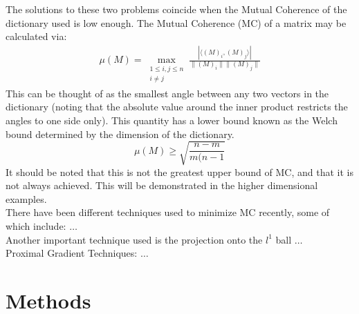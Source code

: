 \documentclass[journal]{IEEEtran}
\begin{document}
The solutions to these two problems coincide when the Mutual Coherence of the dictionary used is low 
enough. The Mutual Coherence (MC) of a matrix may be calculated via:
\begin{align}
\mu(M)=\max\limits_{\substack{1\leq i,j \leq n \\ i\neq j}}\frac{|\langle (M)_i, (M)_j \rangle |}{\|(M)_i\| \|(M)_j\|}
\end{align}
This can be thought of as the smallest angle between any two vectors in the dictionary (noting that
the absolute value around the inner product restricts the angles to one side only). This quantity
has a lower bound known as the Welch bound determined by the dimension of the dictionary.
\begin{equation}
\mu(M) \geq \sqrt{\frac{n - m}{m(n-1}}
\end{equation}
It should be noted that this is not the greatest upper bound of MC, and that it is not always
achieved. This will be demonstrated in the higher dimensional examples. \\
There have been different techniques used to minimize MC recently, some of which include: $\ldots$ \\
Another important technique used is the projection onto the $l^1$ ball $\ldots$\\
Proximal Gradient Techniques: $\ldots$

\section{Methods}
\end{document}
